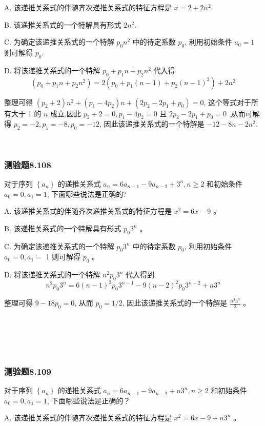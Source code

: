 \documentclass[UTF8, heading=true]{ctexart}
\begin{document}
A. 该递推关系式的伴随齐次递推关系式的特征方程是 $x=2+2 n^2$.

B. 该递推关系式的一个特解具有形式 $2 n^2$.

C. 为确定该递推关系式的一个特解 $p_0 n^2$ 中的待定系数 $p_0$, 利用初始条件 $a_0=1$ 则可解得 $p_0$.

D. 将该递推关系式的一个特解 $p_0+p_1 n+p_2 n^2$ 代入得
$$
\left(p_0+p_1 n+p_2 n^2\right)=2\left(p_0+p_1(n-1)+p_2(n-1)^2\right)+2 n^2
$$

整理可得 $\left(p_2+2\right) n^2+\left(p_1-4 p_2\right) n+\left(2 p_2-2 p_1+p_0\right)=0$, 这个等式对于所有大于 1 的 $n$ 成立,因此 $p_2+2=0, p_1-4 p_2=0$ 且 $2 p_2-2 p_1+p_0=0$ ,从而可解得 $p_2=-2, p_1=-8, p_0=-12$, 因此该递推关系式的一个特解是 $-12-8 n-2 n^2$.


\textcolor{white}{答案：D}

\subsubsection{测验题8.108}

对于序列 $\left\{a_n\right\}$ 的递推关系式 $a_n=6 a_{n-1}-9 a_{n-2}+3^n, n \geq 2$ 和初始条件 $a_0=0, a_1=1$, 下面哪些说法是正确的?

A. 该递推关系式的伴随齐次递推关系式的特征方程是 $x^2=6 x-9$ 。

B. 该递推关系式的一个特解具有形式 $p_0 3^n$ 。

C. 为确定该递推关系式的一个特解 $p_0 3^n$ 中的待定系数 $p_0$, 利用初始条件 $a_0=0, a_1=$ 1 则可解得 $p_0$ 。

D. 将该递推关系式的一个特解 $n^2 p_0 3^n$ 代入得到
$$
n^2 p_0 3^n=6(n-1)^2 p_0 3^{n-1}-9(n-2)^2 p_0 3^{n-2}+n 3^n
$$

整理可得 $9-18 p_0=0$, 从而 $p_0=1 / 2$, 因此该递推关系式的一个特解是 $\frac{n^2 3^n}{2}$ 。

\textcolor{white}{答案：AD}

\textcolor{white}{解析：D选项其实有问题,代入特解后的最后一项应该是$3^n$,而不是$n3^n$。但是算出的$p_0=1/2$是没有问题的。}


\subsubsection{测验题8.109}

对于序列 $\left\{a_n\right\}$ 的递推关系式 $a_n=6 a_{n-1}-9 a_{n-2}+n 3^n, n \geq 2$ 和初始条件 $a_0=0, a_1=1$, 下面哪些说法是正确的？

A. 该递推关系式的伴随齐次递推关系式的特征方程是 $x^2=6 x-9+n 3^n$ 。
\end{document}
